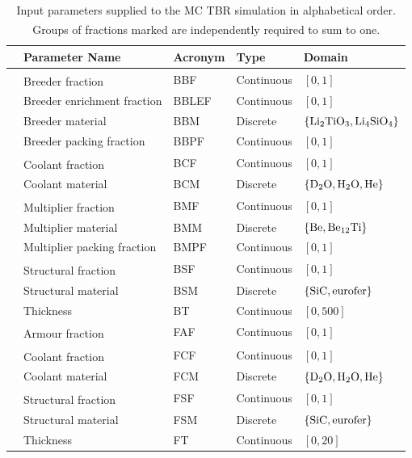 \begin{table}[h]
	\centering
	{\footnotesize
		\begin{tabular}{l|llll}
		\toprule
		{} & Parameter Name & Acronym & Type & Domain\\
		\midrule
		\parbox[t]{2mm}{}
		   & Breeder fraction\textsuperscript{\textdagger} & BBF & Continuous & $[0,1]$\\
		   & Breeder  enrichment fraction & BBLEF & Continuous & $[0,1]$\\
		   & Breeder material & BBM & Discrete & $\{\ce{Li2TiO3}, \ce{Li4SiO4}\}$\\
		   & Breeder packing fraction & BBPF & Continuous & $[0,1]$\\
		   & Coolant fraction\textsuperscript{\textdagger} & BCF & Continuous & $[0,1]$\\
		   & Coolant material & BCM & Discrete & $\{\ce{D2O}, \ce{H2O}, \ce{He}\}$\\
		   & Multiplier fraction\textsuperscript{\textdagger} & BMF & Continuous & $[0,1]$\\
		   & Multiplier material & BMM & Discrete & $\{\ce{Be}, \ce{Be12Ti}\}$\\
		   & Multiplier packing fraction & BMPF & Continuous & $[0,1]$\\
		   & Structural fraction\textsuperscript{\textdagger} & BSF & Continuous & $[0,1]$\\
		   & Structural material & BSM & Discrete & $\{\ce{SiC}, \text{eurofer}\}$\\
		   & Thickness & BT & Continuous & $[0,500]$\\
		\midrule
		\parbox[t]{2mm}{}
		   & Armour fraction\textsuperscript{\textdaggerdbl} & FAF & Continuous & $[0,1]$\\
		   & Coolant fraction\textsuperscript{\textdaggerdbl} & FCF & Continuous & $[0,1]$\\
		   & Coolant material & FCM & Discrete & $\{\ce{D2O}, \ce{H2O}, \ce{He}\}$\\
		   & Structural fraction\textsuperscript{\textdaggerdbl} & FSF & Continuous & $[0,1]$\\
		   & Structural material & FSM & Discrete & $\{\ce{SiC}, \text{eurofer}\}$\\
		   & Thickness & FT & Continuous & $[0,20]$\\
		\bottomrule
		\end{tabular}
	}
	\caption{Input parameters supplied to the MC TBR simulation in alphabetical
		order. Groups of fractions marked\textsuperscript{\textdagger
		\textdaggerdbl} are independently required to sum to one.}
	\label{tbl:params}
\end{table}

